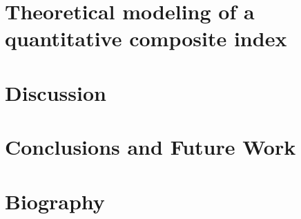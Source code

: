 \documentclass{llncs}
\begin{document}
\section{Theoretical modeling of a quantitative composite index}

\section{Discussion}

\section{Conclusions and Future Work}
% 



\appendix





\section*{Biography}

\end{document}
